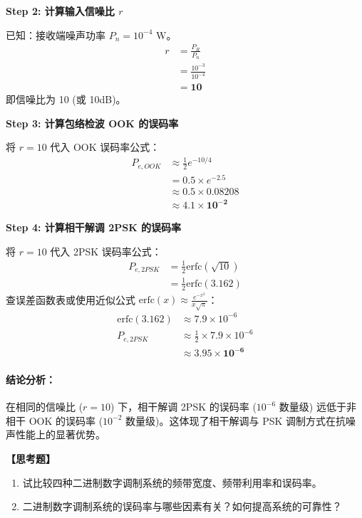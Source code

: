 \documentclass[a4paper,11pt]{ctexart}
\begin{document}
\begin{enumerate}[label=\textbf{7-\arabic*}]
    \textbf{Step 2: 计算输入信噪比 $r$}
    
    已知：接收端噪声功率 $P_n = 10^{-4} \text{ W}$。
    \begin{align*}
        r &= \frac{P_R}{P_n} \\
          &= \frac{10^{-3}}{10^{-4}} \\
          &= \mathbf{10}
    \end{align*}
    即信噪比为 10 (或 10dB)。
    
    \textbf{Step 3: 计算包络检波 OOK 的误码率}
    
    将 $r=10$ 代入 OOK 误码率公式：
    \begin{align*}
        P_{e, OOK} &\approx \frac{1}{2} e^{-10/4} \\
                   &= 0.5 \times e^{-2.5} \\
                   &\approx 0.5 \times 0.08208 \\
                   &\approx \mathbf{4.1 \times 10^{-2}}
    \end{align*}
    
    \textbf{Step 4: 计算相干解调 2PSK 的误码率}
    
    将 $r=10$ 代入 2PSK 误码率公式：
    \begin{align*}
        P_{e, 2PSK} &= \frac{1}{2} \text{erfc}(\sqrt{10}) \\
                    &= \frac{1}{2} \text{erfc}(3.162)
    \end{align*}
    查误差函数表或使用近似公式 $\text{erfc}(x) \approx \frac{e^{-x^2}}{x\sqrt{\pi}}$：
    \begin{align*}
        \text{erfc}(3.162) &\approx 7.9 \times 10^{-6} \\
        P_{e, 2PSK} &\approx \frac{1}{2} \times 7.9 \times 10^{-6} \\
                    &\approx \mathbf{3.95 \times 10^{-6}}
    \end{align*}

    \paragraph{结论分析：}
    在相同的信噪比 ($r=10$) 下，相干解调 2PSK 的误码率 ($10^{-6}$ 数量级) 远低于非相干 OOK 的误码率 ($10^{-2}$ 数量级)。这体现了相干解调与 PSK 调制方式在抗噪声性能上的显著优势。


\end{enumerate}

\noindent\textbf{【思考题】}
\begin{enumerate}
    \item 试比较四种二进制数字调制系统的频带宽度、频带利用率和误码率。
    \item 二进制数字调制系统的误码率与哪些因素有关？如何提高系统的可靠性？
\end{enumerate}
\end{document}
